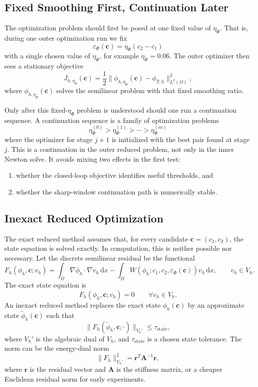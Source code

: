 \documentclass[11pt]{article}
\newcommand{\dd}{\,\mathrm d}
\newcommand{\OmegaD}{\Omega}
\newcommand{\W}{W}
\newcommand{\cvec}{\bm c}
\newcommand{\epsp}{\varepsilon_\Phi}
\begin{document}
\subsection{Fixed Smoothing First, Continuation Later}

The optimization problem should first be posed at one fixed value of
\(\eta_\Phi\).  That is, during one outer optimization run we fix
\[
  \epsp(\cvec)=\eta_\Phi(c_2-c_1)
\]
with a single chosen value of \(\eta_\Phi\), for example
\(\eta_\Phi=0.06\).  The outer optimizer then sees a stationary objective
\[
  J_{h,\eta_\Phi}(\cvec)
  =
  \frac{1}{2}
  \|\phi_{h,\eta_\Phi}(\cvec)-\phi_{T,h}\|_{L^2(\OmegaD)}^2,
\]
where \(\phi_{h,\eta_\Phi}(\cvec)\) solves the semilinear problem with that
fixed smoothing ratio.

Only after this fixed-\(\eta_\Phi\) problem is understood should one run a
continuation sequence.  A continuation sequence is a family of optimization
problems
\[
  \eta_\Phi^{(0)}>\eta_\Phi^{(1)}>\cdots>\eta_\Phi^{(m)}
\]
where the optimizer for stage \(j+1\) is initialized with the best pair found
at stage \(j\).  This is a continuation in the outer reduced problem, not only
in the inner Newton solve.  It avoids mixing two effects in the first test:
\begin{enumerate}[label=(\roman*)]
  \item whether the closed-loop objective identifies useful thresholds, and
  \item whether the sharp-window continuation path is numerically stable.
\end{enumerate}

\subsection{Inexact Reduced Optimization}

The exact reduced method assumes that, for every candidate
\(\cvec=(c_1,c_2)\), the state equation is solved exactly.  In computation,
this is neither possible nor necessary.  Let the discrete semilinear residual
be the functional
\[
  F_h(\phi_h,\cvec;v_h)
  =
  \int_{\OmegaD}\nabla\phi_h\cdot\nabla v_h\dd x
  -
  \int_{\OmegaD}
    \W(\phi_h;c_1,c_2,\epsp(\cvec))v_h
  \dd x,
  \qquad v_h\in V_h.
\]
The exact state equation is
\[
  F_h(\phi_h,\cvec;v_h)=0
  \qquad
  \forall v_h\in V_h.
\]
An inexact reduced method replaces the exact state
\(\phi_h(\cvec)\) by an approximate state \(\widetilde\phi_h(\cvec)\) such
that
\[
  \|F_h(\widetilde\phi_h,\cvec;\cdot)\|_{V_h'} \le \tau_{\mathrm{state}},
\]
where \(V_h'\) is the algebraic dual of \(V_h\), and
\(\tau_{\mathrm{state}}\) is a chosen state tolerance.  The norm can be the
energy-dual norm
\[
  \|F_h\|_{V_h'}^2
  =
  \bm r^T \bm A^{-1}\bm r,
\]
where \(\bm r\) is the residual vector and \(\bm A\) is the stiffness matrix,
or a cheaper Euclidean residual norm for early experiments.
\end{document}
